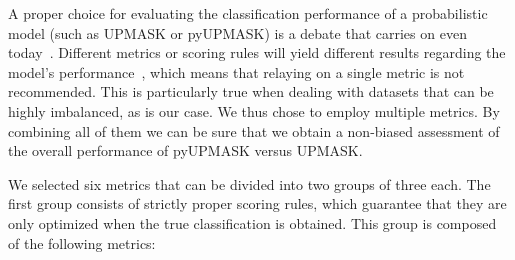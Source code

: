 \documentclass[draft]{aa}
\begin{document}
 A proper choice for evaluating the classification performance of a
 probabilistic model (such as UPMASK or pyUPMASK) is a debate that carries on
 even today~\citep{Hand_2009,hernandez_2012}. Different metrics or scoring
 rules will yield different results regarding the model's
 performance~\citep{Merkle_2013}, which means that relaying on a single metric
 is not recommended. This is particularly true when dealing with datasets that
 can be highly imbalanced, as is our case. We thus chose to employ multiple
 metrics. By combining all of them we can be sure that we obtain a non-biased
 assessment of the overall performance of pyUPMASK versus UPMASK.

 We selected six metrics that can be divided into two groups of three each.
 The first group consists of strictly proper scoring rules, which
 guarantee that they are only optimized when the true classification is
 obtained. This group is composed of the following metrics:\\

\end{document}
